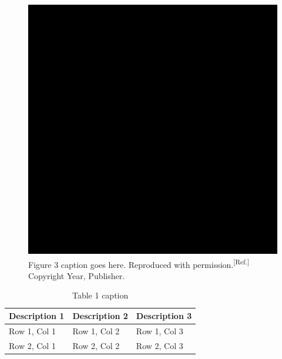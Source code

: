 \documentclass{WileyMSP-template}
\begin{document}
\begin{figure}
  \includegraphics[width=\linewidth]{placeholder-image.png}
  \caption{Figure 3 caption goes here. Reproduced with permission.\textsuperscript{[Ref.]} Copyright Year, Publisher.}
  \label{fig:boat1}
\end{figure}

\begin{table}
 \caption{Table 1 caption}
  \begin{tabular}[htbp]{@{}lll@{}}
    \hline
    Description 1 & Description 2 & Description 3 \\
    \hline
    Row 1, Col 1  & Row 1, Col 2  & Row 1, Col 3  \\
    Row 2, Col 1  & Row 2, Col 2  & Row 2, Col 3  \\
    \hline
  \end{tabular}
\end{table}


\end{document}
